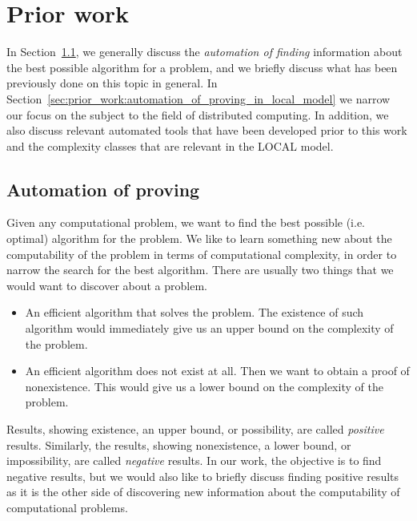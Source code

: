 
\section{Prior work} \label{sec:prior_work}
In Section~\ref{sec:prior_work:automation_of_proving}, we generally discuss the \emph{automation of finding} information about the best possible algorithm for a problem, and we briefly discuss what has been previously done on this topic in general.
In Section~\ref{sec:prior_work:automation_of_proving_in_local_model} we narrow our focus on the subject to the field of distributed computing.
In addition, we also discuss relevant automated tools that have been developed prior to this work and the complexity classes that are relevant in the LOCAL model.

\subsection{Automation of proving} \label{sec:prior_work:automation_of_proving} %
Given any computational problem, we want to find the best possible (i.e. optimal) algorithm for the problem.
We like to learn something new about the computability of the problem in terms of computational complexity, in order to narrow the search for the best algorithm.
There are usually two things that we would want to discover about a problem.
\begin{itemize}
    \item
    An efficient algorithm that solves the problem.
    The existence of such algorithm would immediately give us an upper bound on the complexity of the problem.
    \item
    An efficient algorithm does not exist at all.
    Then we want to obtain a proof of nonexistence.
    This would give us a lower bound on the complexity of the problem.
\end{itemize}
Results, showing existence, an upper bound, or possibility, are called \emph{positive} results.
Similarly, the results, showing nonexistence, a lower bound, or impossibility, are called \emph{negative} results.
In our work, the objective is to find negative results, but we would also like to briefly discuss finding positive results as it is the other side of discovering new information about the computability of computational problems.

